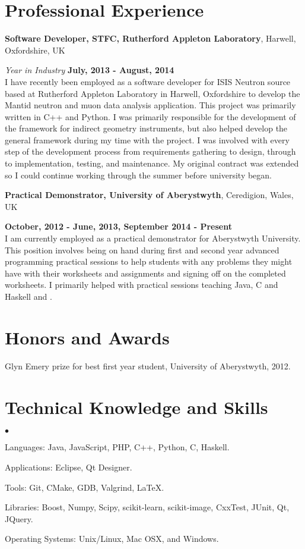 \documentclass[margin,line]{res}
\newenvironment{list2}{
  \begin{list}{$\bullet$}{%
      \setlength{\itemsep}{0in}
      \setlength{\parsep}{0in} \setlength{\parskip}{0in}
      \setlength{\topsep}{0in} \setlength{\partopsep}{0in}
      \setlength{\leftmargin}{0.2in}}}{\end{list}}
\begin{document}
\begin{resume}
\section{\sc Professional Experience}
{\bf Software Developer, STFC, Rutherford Appleton Laboratory}, Harwell, Oxfordshire, UK

\vspace{-.3cm}
{\em Year in Industry} \hfill {\bf July, 2013 - August, 2014}\\
I have recently been employed as a software developer for ISIS Neutron source based at Rutherford Appleton Laboratory in Harwell, Oxfordshire to develop the Mantid neutron and muon data analysis application. This project was primarily written in C++ and Python. I was primarily responsible for the development of the framework for indirect geometry instruments, but also helped develop the general framework during my time with the project. I was involved with every step of the development process from requirements gathering to design, through to implementation, testing, and maintenance. My original contract was extended so I could continue working through the summer before university began.

{\bf Practical Demonstrator, University of Aberystwyth}, Ceredigion, Wales, UK

\vspace{-.3cm}
\hfill {\bf  October, 2012 - June, 2013, September 2014 - Present}\\
I am currently employed as a practical demonstrator for Aberystwyth University. This position involves being on hand during first and second year advanced programming practical sessions to help students with any problems they might have with their worksheets and assignments and signing off on the completed worksheets. I primarily helped with practical sessions teaching Java, C and Haskell and .

\section{\sc Honors and Awards}
Glyn Emery prize for best first year student, University of Aberystwyth, 2012.

\section{\sc Technical Knowledge and  Skills}
\begin{list2}
\item Languages: Java, JavaScript, PHP, C++, Python, C, Haskell.
\item Applications: Eclipse, Qt Designer.
\item Tools: Git, CMake, GDB, Valgrind, \LaTeX.
\item Libraries: Boost, Numpy, Scipy, scikit-learn, scikit-image, CxxTest, JUnit, Qt, JQuery.
\item Operating Systems:  Unix/Linux, Mac OSX, and Windows.\\
\end{list2}


\end{resume}
\end{document}
